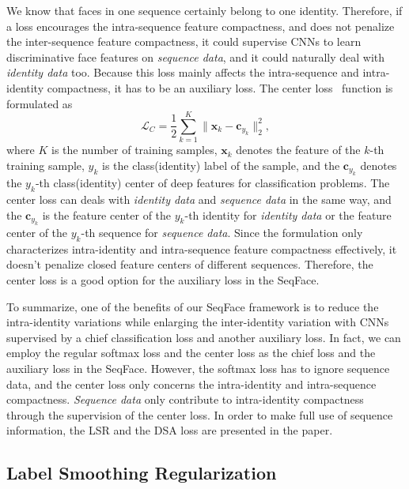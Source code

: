 \documentclass[conference]{acmsiggraph}
\renewcommand{\vec}[1]{\mathbf{#1}}
\begin{document}
We know that faces in one sequence certainly belong to one identity. Therefore, if a loss encourages the intra-sequence feature compactness, and does not penalize the inter-sequence feature compactness, it could supervise CNNs to learn discriminative face features on \emph{sequence data}, and it could naturally deal with \emph{identity data} too. Because this loss mainly affects the intra-sequence and intra-identity compactness, it has to be an auxiliary loss. The center loss~\cite{centerloss} function is formulated as
\begin{equation}
\mathcal{L}_C = \frac{1}{2}\sum\limits_{k=1}^{K}\|\vec{x}_k-\vec{c}_{y_k}\|_2^2,
\end{equation}
where $K$ is the number of training samples, $\vec{x}_k$ denotes the feature of the $k$-th training sample, $y_k$ is the class(identity) label of the sample, and the $\vec{c}_{y_k}$ denotes the $y_k$-th class(identity) center of deep features for classification problems. The center loss can deals with \emph{identity data} and \emph{sequence data} in the same way, and the $\vec{c}_{y_k}$ is the feature center of the $y_k$-th identity for \emph{identity data} or the feature center of the $y_k$-th sequence for \emph{sequence data}. Since the formulation only characterizes intra-identity and intra-sequence feature compactness effectively, it doesn't penalize closed feature centers of different sequences. Therefore, the center loss is a good option for the auxiliary loss in the SeqFace.

To summarize, one of the benefits of our SeqFace framework is to reduce the intra-identity variations while enlarging the inter-identity variation with CNNs supervised by a chief classification loss and another auxiliary loss. In fact, we can employ the regular softmax loss and the center loss as the chief loss and the auxiliary loss in the SeqFace. However, the softmax loss has to ignore sequence data, and the center loss only concerns the intra-identity and intra-sequence compactness. \emph{Sequence data} only contribute to intra-identity compactness through the supervision of the center loss. In order to make full use of sequence information, the LSR and the DSA loss are presented in the paper.

\subsection{Label Smoothing Regularization}
\label{sec::ssoftmax}
\end{document}
